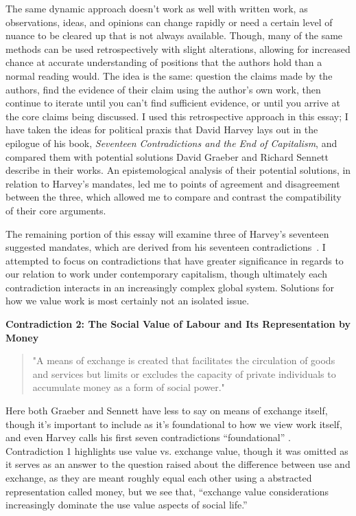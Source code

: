 \documentclass[12pt,a4paper]{article}
\begin{document}
The same dynamic approach doesn’t work as well with written work, as observations, ideas, and opinions can change rapidly or need a certain level of nuance to be cleared up that is not always available. Though, many of the same methods can be used retrospectively with slight alterations, allowing for increased chance at accurate understanding of positions that the authors hold than a normal reading would. The idea is the same: question the claims made by the authors, find the evidence of their claim using the author's own work, then continue to iterate until you can’t find sufficient evidence, or until you arrive at the core claims being discussed. I used this retrospective approach in this essay; I have taken the ideas for political praxis that David Harvey lays out in the epilogue of his book, \textit{Seventeen Contradictions and the End of Capitalism}, and compared them with potential solutions David Graeber and Richard Sennett describe in their works. An epistemological analysis of their potential solutions, in relation to Harvey’s mandates, led me to points of agreement and disagreement between the three, which allowed me to compare and contrast the compatibility of their core arguments. 
\vspace*{10pt}

The remaining portion of this essay will examine three of Harvey's seventeen suggested mandates, which are derived from his seventeen contradictions~\cite{con}. I attempted to focus on contradictions that have greater significance in regards to our relation to work under contemporary capitalism, though ultimately each contradiction interacts in an increasingly complex global system. Solutions for how we value work is most certainly not an isolated issue.

\textbf{Contradiction 2: The Social Value of Labour and Its Representation
by Money}
\begin{quotation} {\color{G-Moon}
    \noindent "A means of exchange is created that facilitates the circulation of goods and services but limits or excludes the capacity of private individuals to accumulate money as a form of social power." \cite{con}}
\end{quotation}
Here both Graeber and Sennett have less to say on means of exchange itself, though it’s important to include as it’s foundational to how we view work itself, and even Harvey calls his first seven contradictions “foundational” \cite{con}. Contradiction 1 highlights use value vs. exchange value, though it was omitted as it serves as an answer to the question raised about the difference between use and exchange, as they are meant roughly equal each other using a abstracted representation called money, but we see that, “exchange value considerations increasingly dominate the use value aspects of social life.” \cite{con}  
\vspace*{10pt}
\end{document}
